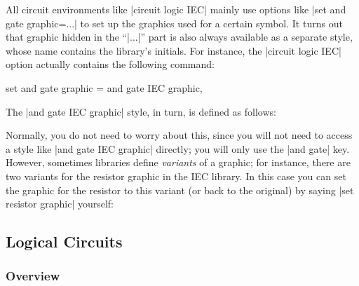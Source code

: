 All circuit environments like |circuit logic IEC| mainly use options
like |set and gate graphic=...| to set up the graphics used for a certain
symbol. It turns out that graphic hidden in the ``|...|'' part is also
always available as a separate style, whose name contains the
library's initials. For instance, the |circuit logic IEC| option
actually contains the following command:
\begin{codeexample}
  set and gate graphic = and gate IEC graphic,
\end{codeexample}
The |and gate IEC graphic| style, in turn, is defined as follows:
\begin{codeexample}
\end{codeexample}

Normally, you do not need to worry about this, since you will not need
to access a style like |and gate IEC graphic| directly; you will only
use the |and gate| key. However, sometimes libraries define
\emph{variants} of a graphic; for instance, there are two variants for
the resistor graphic in the IEC library. In this case you can set the
graphic for the resistor to this variant (or back to the original) by
saying |set resistor graphic| yourself:

\begin{codeexample}[]
\end{codeexample}



\subsection{Logical Circuits}


\subsubsection{Overview}

